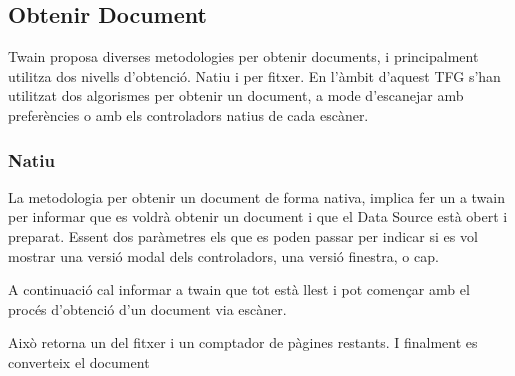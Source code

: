\documentclass[letterpaper,11pt,catalan]{sphinxmanual}
\begin{document}
\subsection{Obtenir Document}
\label{\detokenize{index:obtenir-document}}
Twain proposa diverses metodologies per obtenir documents, i principalment utilitza
dos nivells d'obtenció. Natiu i per fitxer.
En l'àmbit d'aquest TFG s'han utilitzat dos algorismes per obtenir un document, a mode
d'escanejar amb preferències o amb els controladors natius de cada escàner.


\subsubsection{Natiu}
\label{\detokenize{index:natiu}}
La metodologia per obtenir un document de forma nativa, implica fer un  a twain
per informar que es voldrà obtenir un document i que el Data Source està obert i preparat. Essent
dos paràmetres els que es poden passar per indicar si es vol mostrar una versió modal
dels controladors, una versió finestra, o cap.

\begin{sphinxVerbatim}[commandchars=\\\{\}]
 
\end{sphinxVerbatim}

A continuació cal informar a twain que tot està llest i pot començar amb el procés d'obtenció
d'un document via escàner.

\begin{sphinxVerbatim}[commandchars=\\\{\}]
  
     
           
\end{sphinxVerbatim}

Això retorna un  del fitxer i un comptador de pàgines restants. I finalment es converteix el
document

\begin{sphinxVerbatim}[commandchars=\\\{\}]
 
\end{sphinxVerbatim}
\end{document}
